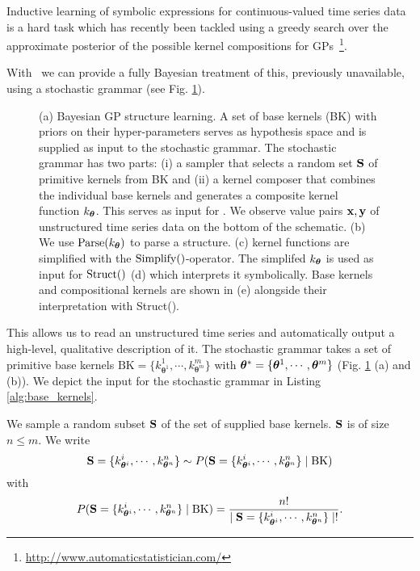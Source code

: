 Inductive learning of symbolic expressions for continuous-valued time series
data is a hard task which has recently been tackled using a greedy search over 
the approximate posterior of the possible kernel compositions for
\ac{GP}s~\citep{duvenaud2013structure,lloyd2014automatic}\footnote{\url{http://www.automaticstatistician.com/}}.

With \gpmem\ we can provide a fully Bayesian treatment of this, previously unavailable,
using a stochastic grammar  (see Fig. \ref{fig:schema}).
\begin{figure}
\centering

\caption{\footnotesize (a) Bayesian GP structure learning. A set of
base kernels (BK) with priors on their hyper-parameters serves as hypothesis space
and is supplied as input to the stochastic grammar. The stochastic grammar has
two parts: (i) a sampler that selects a random set $\mathbf{S}$  of primitive kernels from BK
and (ii) a kernel composer that combines the individual base kernels and generates
a composite kernel function
$k_{\bm{\theta}}$. This serves as input for
\gpmem.  We observe value pairs $\mathbf{x},\mathbf{y}$ of unstructured time series data on
the bottom of the schematic.
(b) We use $\text{Parse}(k_{\bm{\theta}})$ to parse a structure. (c) kernel functions are
simplified with the $\text{Simplify}()$-operator. The simplifed $k_{\bm{\theta}}$ is used as input for
$\text{Struct}()$ (d) which  interprets it symbolically.
Base kernels and compositional kernels are shown in (e) alongside their
interpretation with Struct().}\label{fig:schema}
\end{figure}
This allows us to read an unstructured time series and automatically output a high-level,
qualitative description of it. The stochastic grammar takes a set of primitive base kernels 
    $\text{BK}=\{k_{\bm{\theta}^1}^1,\cdots,k_{\bm{\theta}^m}^m\}$ with
    $\bm{\theta}^*=\{\bm{\theta}^1,\cdots,\bm{\theta}^m\}$ (Fig. \ref{fig:schema} (a) and
(b)).
We depict the input for the
stochastic grammar in Listing \ref{alg:base_kernels}.

We sample a random subset $\mathbf{S}$ of
the set of supplied base kernels. $\mathbf{S}$ is of size $n \leq m$. We write
\[
\mathbf{S} = \{k_{\bm{\theta}^i}^i,\cdots,k_{\bm{\theta}^n}^n\}
\sim P(\mathbf{S} = \{k_{\bm{\theta}^i}^i,\cdots,k_{\bm{\theta}^n}^n\} \mid
\text{BK}) 
\]
with
\[
P(\mathbf{S} = \{k_{\bm{\theta}^i}^i,\cdots,k_{\bm{\theta}^n}^n\}\mid \text{BK}) =
\frac{n!}{ \mid \mathbf{S} = \{k_{\bm{\theta}^i}^i,\cdots,k_{\bm{\theta}^n}^n\}\mid !}.
\]

